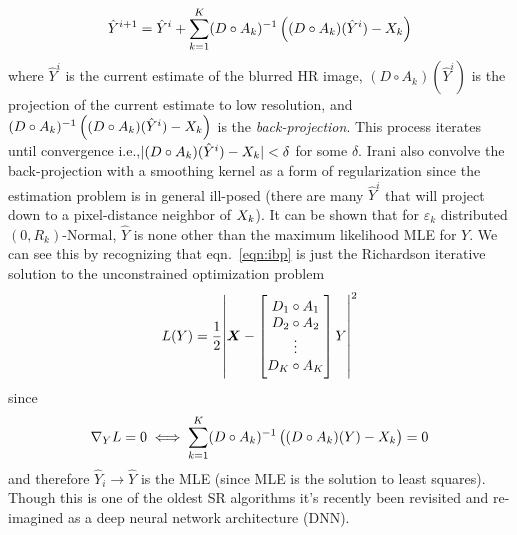 \begin{equation}
	\hat{Y}^{i+1} = \hat{Y}^i + \sum_{k=1}^K (D \circ A_k)^{-1}\left( (D \circ A_k)(\hat{Y}^i) - \Xk \right)
	\label{eqn:ibp}
\end{equation}
where \(\hat{Y}^i\) is the current estimate of the blurred HR image, \((D \circ A_k)(\hat{Y}^i)\) is the projection of the current estimate to low resolution, and \((D \circ A_k)^{-1}\left( (D \circ A_k)(\hat{Y}^i) - X_k \right)\) is the \textit{back-projection}.
%
This process iterates until convergence i.e.,\(\lvert (D \circ A_k)(\hat{Y}^i) - X_k \rvert < \delta\) for some \(\delta\).
%
Irani \etal\cite{Irani1991ImprovingRB} also convolve the back-projection with a smoothing kernel as a form of regularization since the estimation problem is in general ill-posed (there are many \(\hat{Y}^{i}\) that will project down to a pixel-distance neighbor of \(X_k\)).
%
It can be shown\cite{Elad1996} that for \(\varepsilon_k\) distributed \((0, R_k)\)-Normal, \(\hat{Y}\) is none other than the maximum likelihood MLE for \(Y\).
%
We can see this by recognizing that eqn.~\eqref{eqn:ibp} is just the Richardson iterative\cite{Anderssen:1972:RNM:891962} solution to the unconstrained optimization problem
\begin{equation}
	L(Y) = \frac{1}{2} \abs{ \bm{X} -  \begin{bmatrix}
		D_1 \circ A_1 \\
		D_2 \circ A_2 \\
		\vdots        \\
		D_K \circ A_K \\
	\end{bmatrix}  Y  }^2
	\label{eqn:l2regression}
\end{equation}
since
\begin{equation*}
	\nabla_{Y} L = 0
	\iff
	\sum_{k=1}^K (D \circ A_k)^{-1}\left( (D \circ A_k)(Y) - X_k \right) = 0
\end{equation*}
and therefore \(\hat{Y}_i \rightarrow \hat{Y}\) is the MLE (since MLE is the solution to least squares\cite{CaseBerg:01}).
%
Though this is one of the oldest SR algorithms it's recently been revisited and re-imagined as a deep neural network architecture (DNN)\cite{DBLP:journals.corr.abs-1803-02735}.
